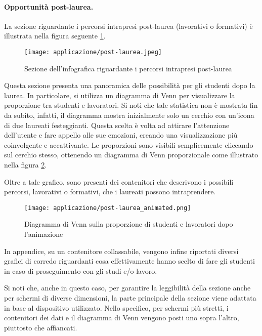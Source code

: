 \paragraph{Opportunità post-laurea.} La sezione riguardante i percorsi intrapresi post-laurea (lavorativi o formativi) è illustrata nella figura seguente \ref{fig:app_post-laurea}. 
\begin{figure}[H] 
    \centering 
    \texttt{[image: applicazione/post-laurea.jpeg]} 
    \caption{Sezione dell'infografica riguardante i percorsi intrapresi post-laurea}
    \label{fig:app_post-laurea}
\end{figure}
\noindent Questa sezione presenta una panoramica delle possibilità per gli studenti dopo la laurea. In particolare, si utilizza un diagramma di Venn per visualizzare la 
proporzione tra studenti e lavoratori. 
Si noti che tale statistica non è mostrata fin da subito, infatti, il diagramma mostra inizialmente solo un cerchio con un'icona di due laureati festeggianti.
Questa scelta è volta ad attirare l'attenzione dell'utente e fare appello alle sue emozioni, creando una visualizzazione più coinvolgente e accattivante. 
Le proporzioni sono visibili semplicemente cliccando sul cerchio stesso, ottenendo un diagramma di Venn proporzionale come illustrato nella figura 
\ref{fig:app_post-laurea_animated}. 

Oltre a tale grafico, sono presenti dei contenitori che descrivono i possibili percorsi, lavorativi o formativi, che i laureati possono intraprendere.
\begin{figure}[H] 
    \centering 
    \texttt{[image: applicazione/post-laurea\_animated.png]} 
    \caption{Diagramma di Venn sulla proporzione di studenti e lavoratori dopo l'animazione}
    \label{fig:app_post-laurea_animated}
\end{figure}

In appendice, su un contenitore collassabile, vengono infine riportati diversi grafici di corredo riguardanti cosa effettivamente hanno scelto di fare gli studenti in caso 
di proseguimento con gli studi e/o lavoro.

\bigskip
\noindent Si noti che, anche in questo caso, per garantire la leggibilità della sezione anche per schermi di diverse dimensioni, la parte principale della sezione viene adattata 
in base al dispositivo utilizzato. Nello specifico, per schermi più stretti, i contenitori dei dati e il diagramma di Venn vengono posti uno sopra l'altro, piuttosto che affiancati.

